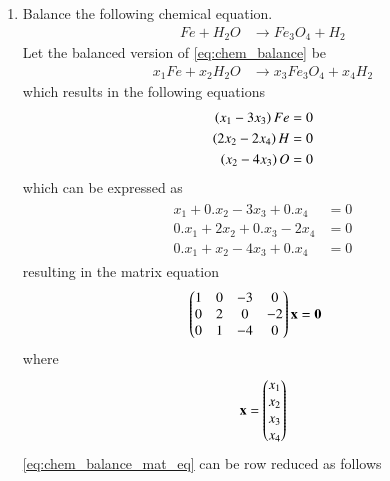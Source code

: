 	
\renewcommand{\theequation}{\theenumi}
\begin{enumerate}[label=\arabic*.,ref=\thesubsection.\theenumi]

\item Balance the following chemical equation.
%
\begin{align}
\label{eq:chem_balance}
Fe+H_2O &\rightarrow Fe_3O_4 + H_2
\end{align}
%
\solution Let the balanced version of \eqref{eq:chem_balance} be 
%
\begin{align}
\label{eq:chem_balance_unsol}
x_1Fe+x_2H_2 O &\rightarrow x_3Fe_3 O_4 + x_4H_2
\end{align}
%
which results in the following equations
%
\begin{align}
\begin{split}
\left(x_1 -3x_3\right)Fe &= 0
\\
\left(2x_2 -2x_4\right)H &= 0
\\
\left(x_2 -4x_3\right)O &= 0
\end{split}
\end{align}
which can be expressed as
\begin{align}
\begin{split}
x_1 + 0.x_2 -3x_3 +0.x_4&= 0
\\
0.x_1+2x_2 +0.x_3-2x_4 &= 0
\\
0.x_1+x_2 -4x_3+ 0.x_4 &= 0
\end{split}
\end{align}
%
resulting in the matrix equation
\begin{align}
\label{eq:chem_balance_mat_eq}
\begin{split}
\begin{pmatrix}
1 & 0 & -3 & 0
\\
0 & 2 & 0 & -2
\\
0 & 1 & -4 & 0
\end{pmatrix}
\mathbf{x} &= \mathbf{0}
\end{split}
\end{align}
%
where
\begin{align}
\mathbf{x} = \begin{pmatrix}x_1 \\ x_2 \\ x_3 \\ x_4\end{pmatrix} 
\end{align}
\eqref{eq:chem_balance_mat_eq} can be row reduced as follows
%
\begin{align}
\label{eq:chem_balance_mat_row}

\end{align}
\end{enumerate}
